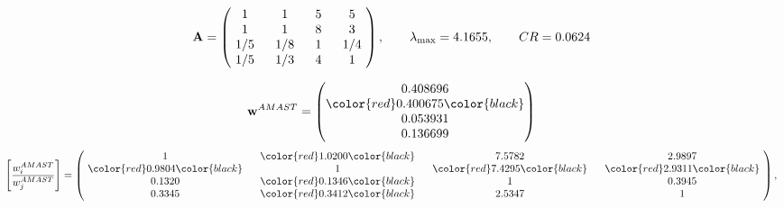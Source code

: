 \begin{example}
\begin{equation*}
\mathbf{A} =
\begin{pmatrix}
$\,\,$ 1 $\,\,$ & $\,\,$1$\,\,$ & $\,\,$5$\,\,$ & $\,\,$5 $\,\,$ \\
$\,\,$ 1 $\,\,$ & $\,\,$ 1 $\,\,$ & $\,\,$8$\,\,$ & $\,\,$3 $\,\,$ \\
$\,\,$ 1/5$\,\,$ & $\,\,$ 1/8$\,\,$ & $\,\,$ 1 $\,\,$ & $\,\,$ 1/4 $\,\,$ \\
$\,\,$ 1/5$\,\,$ & $\,\,$ 1/3$\,\,$ & $\,\,$4$\,\,$ & $\,\,$ 1  $\,\,$ \\
\end{pmatrix},
\qquad
\lambda_{\max} =
4.1655,
\qquad
CR = 0.0624
\end{equation*}

\begin{equation*}
\mathbf{w}^{AMAST} =
\begin{pmatrix}
0.408696\\
\color{red} 0.400675\color{black} \\
0.053931\\
0.136699
\end{pmatrix}\end{equation*}
\begin{equation*}
\left[ \frac{{w}^{AMAST}_i}{{w}^{AMAST}_j} \right] =
\begin{pmatrix}
$\,\,$ 1 $\,\,$ & $\,\,$\color{red} 1.0200\color{black} $\,\,$ & $\,\,$7.5782$\,\,$ & $\,\,$2.9897$\,\,$ \\
$\,\,$\color{red} 0.9804\color{black} $\,\,$ & $\,\,$ 1 $\,\,$ & $\,\,$\color{red} 7.4295\color{black} $\,\,$ & $\,\,$\color{red} 2.9311\color{black}   $\,\,$ \\
$\,\,$0.1320$\,\,$ & $\,\,$\color{red} 0.1346\color{black} $\,\,$ & $\,\,$ 1 $\,\,$ & $\,\,$0.3945 $\,\,$ \\
$\,\,$0.3345$\,\,$ & $\,\,$\color{red} 0.3412\color{black} $\,\,$ & $\,\,$2.5347$\,\,$ & $\,\,$ 1  $\,\,$ \\
\end{pmatrix},
\end{equation*}


\end{example}
